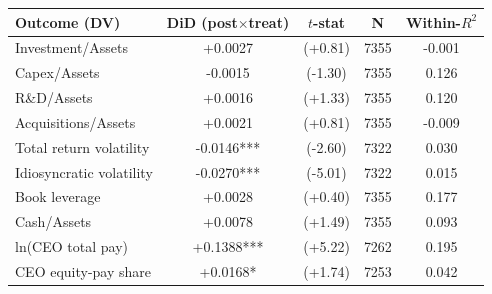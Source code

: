 \begin{tabular}{lcccc}
\toprule
Outcome (DV) & DiD (post$\times$treat) & $t$-stat & N & Within-$R^2$ \\
\midrule
Investment/Assets & +0.0027 & (+0.81) & 7355 & -0.001 \\
Capex/Assets & -0.0015 & (-1.30) & 7355 & 0.126 \\
R\&D/Assets & +0.0016 & (+1.33) & 7355 & 0.120 \\
Acquisitions/Assets & +0.0021 & (+0.81) & 7355 & -0.009 \\
Total return volatility & -0.0146*** & (-2.60) & 7322 & 0.030 \\
Idiosyncratic volatility & -0.0270*** & (-5.01) & 7322 & 0.015 \\
Book leverage & +0.0028 & (+0.40) & 7355 & 0.177 \\
Cash/Assets & +0.0078 & (+1.49) & 7355 & 0.093 \\
ln(CEO total pay) & +0.1388*** & (+5.22) & 7262 & 0.195 \\
CEO equity-pay share & +0.0168* & (+1.74) & 7253 & 0.042 \\
\bottomrule
\end{tabular}